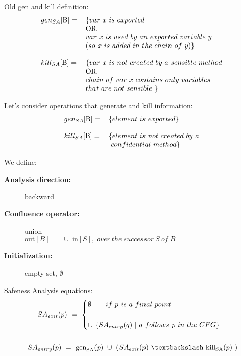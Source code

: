 \documentclass[letterpaper,twocolumn,10pt]{article}
\begin{document}
Old gen and kill definition:\\
\begin{align*}
\begin{tabular}{  l l }
	$ gen_{SA}[\text{B}]= $ & $ \{ var\ x\ is\ exported $\\ 
	& OR \\
	& $ var\ x\ is\ used\ by\ an\ exported\ variable\ y\ $\\ 
	& $ ( so\ x\ is\ added\ in\ the\ chain\ of\ y ) \} $ \\
	& \\                  
	$  kill_{SA}[\text{B}]= $ & $ \{ var\ x\ is\ not\ created\ by\ a\ sensible\ method\ $\\
    & OR \\ 
    & $ chain\ of\ var\ x\ contains\ only\ variables\ $ \\
    & $ that\ are\ not\ sensible\ \} $ \\
\end{tabular}
\end{align*}

Let's consider operations that generate and kill information:
\begin{align*}
\begin{tabular}{  l l }
	$ gen_{SA}[\text{B}]= $ & $ \{ element\ is\ exported \} $\\ 
	& \\                  
	$  kill_{SA}[\text{B}]= $ & $ \{ element\ is\ not\ created\ by\ a\ $\\ 
	& $\ confidential\ method \} $ \\
\end{tabular}
\end{align*}

We define: 
\begin{description}
\item[\textbf{Analysis direction:}] backward
\item[\textbf{Confluence operator: }] union\\ $ \text{out}[B]\ =\ \cup\ \text{in}[S],\ over\ the\ successor\ S\ of\ B\  $
\item[\textbf{Initialization: }] empty set, \quad $ \emptyset $
\end{description}

Safeness Analysis equations:
\begin{gather*}
SA_\textrm{$exit$}(p)\ =\ 
\begin{cases}
\emptyset\qquad if\ p\ is\ a\ final\ point\ \\ \\
\cup\ \lbrace SA_\textrm{$entry$}(q)\ |\ q\ follows\ p\ in\ the\ CFG \rbrace 
\end{cases} \\ \\
SA_\textrm{$entry$}(p)\ =\ \text{gen}_\textrm{SA}(p)\ \cup\ (SA_\textrm{$exit$}(p)\ \textbackslash\ \text{kill}_\textrm{SA}(p)\ )
\end{gather*}
\end{document}
